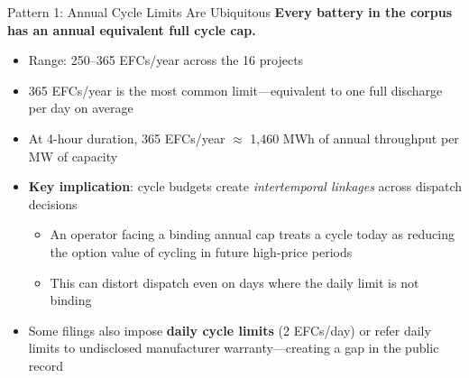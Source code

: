 
\begin{frame}{Pattern 1: Annual Cycle Limits Are Ubiquitous}
\textbf{Every battery in the corpus has an annual equivalent full cycle cap.}
\vspace{0.3cm}
\begin{itemize}
    \item Range: 250--365 EFCs/year across the 16 projects
    \item 365 EFCs/year is the most common limit---equivalent to one full discharge per day on average
    \item At 4-hour duration, 365 EFCs/year $\approx$ 1,460 MWh of annual throughput per MW of capacity
    \pause
    \item \textbf{Key implication}: cycle budgets create \textit{intertemporal linkages} across dispatch decisions
    \begin{itemize}
        \item An operator facing a binding annual cap treats a cycle today as reducing the option value of cycling in future high-price periods
        \item This can distort dispatch even on days where the daily limit is not binding
    \end{itemize}
    \pause
    \item Some filings also impose \textbf{daily cycle limits} (2 EFCs/day) or refer daily limits to undisclosed manufacturer warranty---creating a gap in the public record
\end{itemize}
\end{frame}

